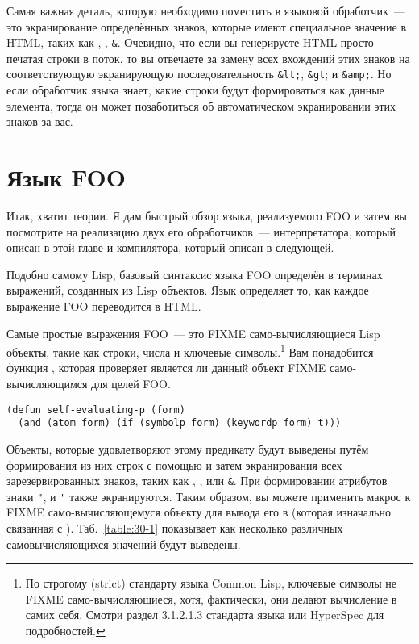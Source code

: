 Самая важная деталь, которую необходимо поместить в языковой обработчик~--- это
экранирование определённых знаков, которые имеют специальное значение в HTML, таких как
\code{<}, \code{>}, \lstinline!&!. Очевидно, что если вы генерируете HTML просто печатая
строки в поток, то вы отвечаете за замену всех вхождений этих знаков на соответствующую
экранирующую последовательность \lstinline!&lt;!, \lstinline!&gt!; и \lstinline!&amp;!. Но
если обработчик языка знает, какие строки будут формироваться как данные элемента, тогда
он может позаботиться об автоматическом экранировании этих знаков за вас.

\section{Язык FOO}

Итак, хватит теории. Я дам быстрый обзор языка, реализуемого FOO и затем вы посмотрите на
реализацию двух его обработчиков~--- интерпретатора, который описан в этой главе и
компилятора, который описан в следующей.

Подобно самому Lisp, базовый синтаксис языка FOO определён в терминах выражений, созданных
из Lisp объектов. Язык определяет то, как каждое выражение FOO переводится в HTML.

Самые простые выражения FOO~--- это FIXME само-вычисляющиеся Lisp объекты, такие как
строки, числа и ключевые символы.\footnote{По строгому (strict) стандарту языка Common
  Lisp, ключевые символы не FIXME само-вычисляющиеся, хотя, фактически, они делают
  вычисление в самих себя. Смотри раздел 3.1.2.1.3 стандарта языка или HyperSpec для
  подробностей.} Вам понадобится функция , которая проверяет
является ли данный объект FIXME само-вычисляющимся для целей FOO.

\begin{lstlisting}
(defun self-evaluating-p (form)
  (and (atom form) (if (symbolp form) (keywordp form) t)))
\end{lstlisting}

Объекты, которые удовлетворяют этому предикату будут выведены путём формирования из них
строк с помощью  и затем экранирования всех зарезервированных
знаков, таких как \code{<}, \code{>}, или \lstinline!&!. При формировании атрибутов знаки
\lstinline!"!, и \lstinline!'! также экранируются. Таким образом, вы можете применить
макрос  к FIXME само-вычисляющемуся объекту для вывода его в
 (которая изначально связанная с
). Таб.~\ref{table:30-1} показывает как несколько различных
самовычисляющихся значений будут выведены.

